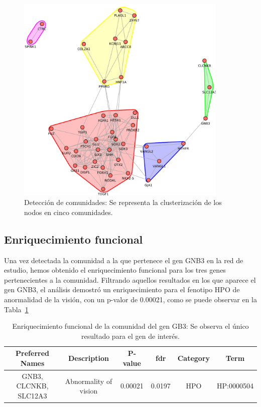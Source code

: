 \begin{figure}[h!]
	\includegraphics[width=0.9\textwidth]{figures/comunidades.pdf}
	\caption{Detección de comunidades: Se representa la clusterización de los nodos en cinco comunidades.}
	\label{fig:comunidad}
\end{figure}

\subsection{Enriquecimiento funcional}

Una vez detectada la comunidad a la que pertenece el gen GNB3 en la red de estudio, hemos obtenido el enriquecimiento funcional para los tres genes pertenecientes a la comunidad.  Filtrando aquellos resultados en los que aparece el gen GNB3, el análisis demostró un enriquecimiento para el fenotipo HPO de anormalidad de la visión, con un p-valor de 0.00021, como se puede observar en la Tabla~\ref{table:enriquecimiento1}

\begin{table}[h]
	\centering
	\caption{Enriquecimiento funcional de la comunidad del gen GB3: Se observa el único resultado para el gen de interés.}
	\label{table:enriquecimiento1}
	\begin{tabular}{|c|c|c|c|c|c|}
		\hline
		\textbf{Preferred Names} & \textbf{Description} & \textbf{P-value} & \textbf{fdr} & \textbf{Category} & \textbf{Term} \\ \hline
		GNB3, CLCNKB, SLC12A3 & Abnormality of vision    & 0.00021 & 0.0197&  HPO & HP:0000504 \\ \hline

	\end{tabular}

\end{table}

